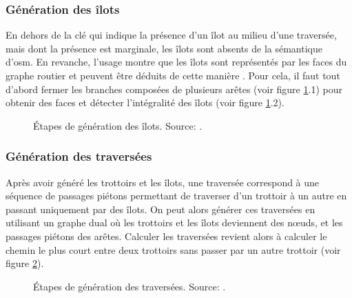 \subsubsection{Génération des îlots}

En dehors de la clé  qui indique la présence d'un îlot au milieu d'une traversée, mais dont la présence est marginale, les îlots sont absents de la sémantique d'\gls{osm}. En revanche, l'usage montre que les îlots sont représentés par les faces du graphe routier et peuvent être déduits de cette manière \citep{Vitalis2022}. Pour cela, il faut tout d'abord fermer les branches composées de plusieurs arêtes (voir figure \ref{fig:modelisation_calcul_pieton_ilots}.1) pour obtenir des faces et détecter l'intégralité des îlots (voir figure \ref{fig:modelisation_calcul_pieton_ilots}.2).

\begin{figure}[ht]
    \centering
    \caption[Génération d'îlots]{Étapes de génération des îlots. Source: \citep{Kalsron2022}.}
    \label{fig:modelisation_calcul_pieton_ilots}
\end{figure}

\subsubsection{Génération des traversées}

Après avoir généré les trottoirs et les îlots, une traversée correspond à une séquence de passages piétons permettant de traverser d'un trottoir à un autre en passant uniquement par des îlots. On peut alors générer ces traversées en utilisant un graphe dual où les trottoirs et les îlots deviennent des nœuds, et les passages piétons des arêtes. Calculer les traversées revient alors à calculer le chemin le plus court entre deux trottoirs sans passer par un autre trottoir (voir figure \ref{fig:modelisation_calcul_pieton_traversees}).

\begin{figure}[ht]
    \centering
    \caption[Génération de traversées]{Étapes de génération des traversées. Source: \citep{Kalsron2022}.}
    \label{fig:modelisation_calcul_pieton_traversees}
\end{figure}

